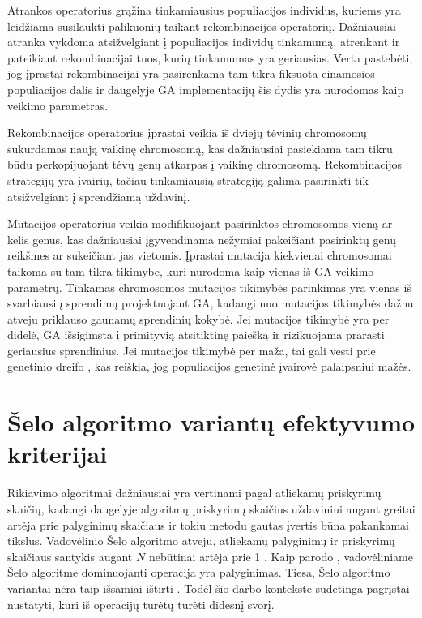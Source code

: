 \documentclass{VUMIFInfKursinis}
\begin{document}
Atrankos operatorius grąžina tinkamiausius populiacijos individus, kuriems yra leidžiama susilaukti palikuonių taikant rekombinacijos operatorių.
Dažniausiai atranka vykdoma atsižvelgiant į populiacijos individų tinkamumą, atrenkant ir pateikiant rekombinacijai tuos, kurių tinkamumas yra geriausias.
Verta pastebėti, jog įprastai rekombinacijai yra pasirenkama tam tikra fiksuota einamosios populiacijos dalis
ir daugelyje GA implementacijų šis dydis yra nurodomas kaip veikimo parametras.

Rekombinacijos operatorius įprastai veikia iš dviejų tėvinių chromosomų sukurdamas naują vaikinę chromosomą, kas dažniausiai pasiekiama
tam tikru būdu perkopijuojant tėvų genų atkarpas į vaikinę chromosomą.
Rekombinacijos strategijų yra įvairių, tačiau tinkamiausią strategiją galima pasirinkti tik atsižvelgiant į sprendžiamą uždavinį.

Mutacijos operatorius veikia modifikuojant pasirinktos chromosomos vieną ar kelis genus,
kas dažniausiai įgyvendinama nežymiai pakeičiant pasirinktų genų reikšmes ar sukeičiant jas vietomis.
Įprastai mutacija kiekvienai chromosomai taikoma su tam tikra tikimybe, kuri nurodoma kaip vienas iš GA veikimo parametrų.
Tinkamas chromosomos mutacijos tikimybės parinkimas yra vienas iš svarbiausių sprendimų projektuojant GA,
kadangi nuo mutacijos tikimybės dažnu atveju priklauso gaunamų sprendinių kokybė.
Jei mutacijos tikimybė yra per didelė, GA išsigimsta į primityvią atsitiktinę paiešką \cite{hassanat2019choosing} ir rizikuojama prarasti geriausius sprendinius.
Jei mutacijos tikimybė per maža, tai gali vesti prie genetinio dreifo \cite{masel2011genetic},
kas reiškia, jog populiacijos genetinė įvairovė palaipsniui mažės.

\section{Šelo algoritmo variantų efektyvumo kriterijai}

Rikiavimo algoritmai dažniausiai yra vertinami pagal atliekamų priskyrimų skaičių, kadangi
daugelyje algoritmų priskyrimų skaičius uždaviniui augant greitai artėja prie palyginimų skaičiaus ir
tokiu metodu gautas įvertis būna pakankamai tikslus.
Vadovėlinio Šelo algoritmo atveju, atliekamų palyginimų ir priskyrimų skaičiaus santykis augant $N$ nebūtinai artėja prie 1 \cite{Radavičius_Baranauskas_2013}.
Kaip parodo \cite{ciura2001best}, vadovėliniame Šelo algoritme dominuojanti operacija yra palyginimas.
Tiesa, Šelo algoritmo variantai nėra taip išsamiai ištirti \cite{brejova2001analyzing}.
Todėl šio darbo kontekste sudėtinga pagrįstai nustatyti, kuri iš operacijų turėtų turėti didesnį svorį.
\end{document}
